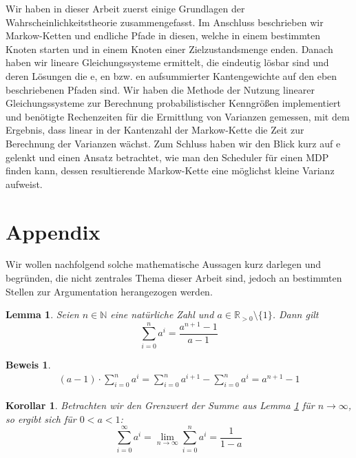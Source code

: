 \documentclass[a4paper]{article}
\newcommand{\mc}{Markow-Kette}
\newtheorem{korollar}[satz]{Korollar}
\newtheorem{lemma}[satz]{Lemma}
\theoremstyle{nonumberplain}
\newtheorem{beweis}{Beweis}
\begin{document}
	Wir haben in dieser Arbeit zuerst einige Grundlagen der Wahrscheinlichkeitstheorie zusammengefasst. Im Anschluss beschrieben wir \mc{}n und endliche Pfade in diesen, welche in einem bestimmten Knoten starten und in einem Knoten einer Zielzustandsmenge enden. Danach haben wir lineare Gleichungssysteme ermittelt, die eindeutig lösbar sind und deren Lösungen die \expect{}e, \var{}en bzw. \cov{}en aufsummierter Kantengewichte auf den eben beschriebenen Pfaden sind.
	Wir haben die Methode der Nutzung linearer Gleichungssysteme zur Berechnung probabilistischer Kenngrößen implementiert und benötigte Rechenzeiten für die Ermittlung von Varianzen gemessen, mit dem Ergebnis, dass linear in der Kantenzahl der \mc{} die Zeit zur Berechnung der Varianzen wächst. Zum Schluss haben wir den Blick kurz auf \mdp{}e gelenkt und einen Ansatz betrachtet, wie man den Scheduler für einen MDP finden kann, dessen resultierende \mc{} eine möglichst kleine Varianz aufweist.

	\section{Appendix}
	
	Wir wollen nachfolgend solche mathematische Aussagen kurz darlegen und begründen, die nicht zentrales Thema dieser Arbeit sind, jedoch an bestimmten Stellen zur Argumentation herangezogen werden.
	
	\begin{lemma} \label{lem-geosum}
		Seien $n \in \mathbb{N}$ eine natürliche Zahl und $a \in \mathbb{R}_{>0}\setminus\{1\}$. Dann gilt
		\begin{equation}
		\sum_{i=0}^{n}{a^i} = \frac{a^{n+1}-1}{a-1}
		\end{equation}
	\end{lemma}
	\begin{beweis}
		\begin{align*}
		(a-1) \cdot \sum_{i=0}^{n}{a^i} = \sum_{i=0}^{n}{a^{i+1}} - \sum_{i=0}^{n}{a^i} = a^{n+1} - 1
		\end{align*}
	\end{beweis}
	
	\begin{korollar} \label{kor-geosum}
		Betrachten wir den Grenzwert der Summe aus Lemma \ref{lem-geosum} für $n \to \infty$, so ergibt sich für $0<a<1$:
		\begin{equation}
		\sum_{i=0}^{\infty}{a^i}
		= \lim\limits_{n \to \infty} \sum_{i=0}^{n}{a^i}
		= \frac{1}{1-a}
		\end{equation}
	\end{korollar}
	
\end{document}
